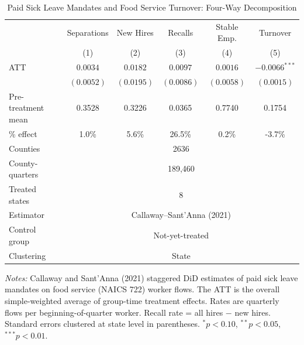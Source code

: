 \begin{table}[t]
\centering
\begin{threeparttable}
\caption{Paid Sick Leave Mandates and Food Service Turnover: Four-Way Decomposition}
\label{tab:main}
\small
\begin{tabular}{lccccc}
\hline\hline
 & Separations & New Hires & Recalls & Stable Emp. & Turnover \\
 & (1) & (2) & (3) & (4) & (5) \\
\hline
\addlinespace
ATT & $0.0034$ & $0.0182$ & $0.0097$ & $0.0016$ & $-0.0066^{***}$ \\
 & $(0.0052)$ & $(0.0195)$ & $(0.0086)$ & $(0.0058)$ & $(0.0015)$ \\
\addlinespace
Pre-treatment mean & 0.3528 & 0.3226 & 0.0365 & 0.7740 & 0.1754 \\
\% effect & 1.0\% & 5.6\% & 26.5\% & 0.2\% & -3.7\% \\
\addlinespace
Counties & \multicolumn{5}{c}{2636} \\
County-quarters & \multicolumn{5}{c}{189,460} \\
Treated states & \multicolumn{5}{c}{8} \\
Estimator & \multicolumn{5}{c}{Callaway--Sant'Anna (2021)} \\
Control group & \multicolumn{5}{c}{Not-yet-treated} \\
Clustering & \multicolumn{5}{c}{State} \\
\hline\hline
\end{tabular}
\begin{tablenotes}[flushleft]
\footnotesize
\item \textit{Notes:} Callaway and Sant'Anna (2021) staggered DiD estimates of paid sick leave mandates on food service (NAICS 722) worker flows. The ATT is the overall simple-weighted average of group-time treatment effects. Rates are quarterly flows per beginning-of-quarter worker. Recall rate = all hires $-$ new hires. Standard errors clustered at state level in parentheses. $^{*}p<0.10$, $^{**}p<0.05$, $^{***}p<0.01$.
\end{tablenotes}
\end{threeparttable}
\end{table}

